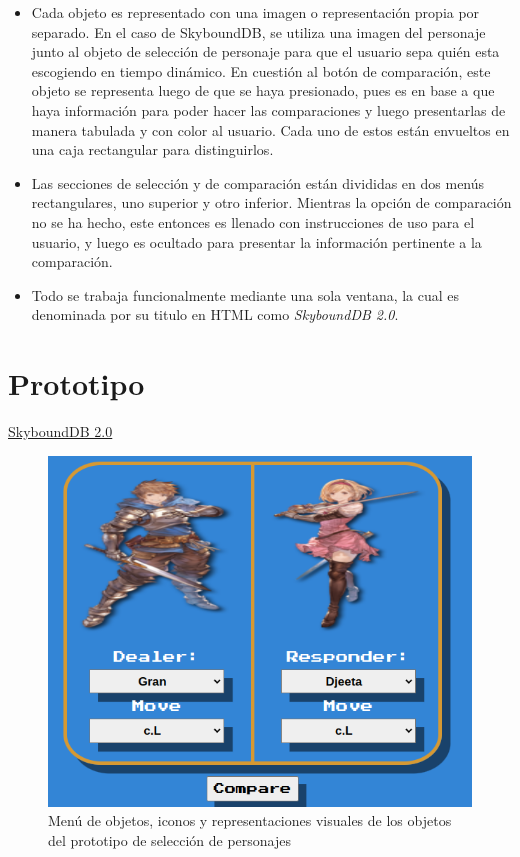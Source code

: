 \begin{itemize}
\begin{itemize}
    \end{itemize}
    \item Cada objeto es representado con una imagen o representación propia por separado. En el caso de SkyboundDB, se utiliza una imagen del personaje junto al objeto de selección de personaje para que el usuario sepa quién esta escogiendo en tiempo dinámico. En cuestión al botón de comparación, este objeto se representa luego de que se haya presionado, pues es en base a que haya información para poder hacer las comparaciones y luego presentarlas de manera tabulada y con color al usuario. Cada uno de estos están envueltos en una caja rectangular para distinguirlos.
    \item Las secciones de selección y de comparación están divididas en dos menús rectangulares, uno superior y otro inferior. Mientras la opción de comparación no se ha hecho, este entonces es llenado con instrucciones de uso para el usuario, y luego es ocultado para presentar la información pertinente a la comparación.
    \item Todo se trabaja funcionalmente mediante una sola ventana, la cual es denominada por su titulo en HTML como \textit{SkyboundDB 2.0}.
\end{itemize}

\section{Prototipo}



\href{https://aramis-matos.github.io/skyboundDB2.0/}{SkyboundDB 2.0}

\begin{center}
    \begin{figure}[ht!]
        \centering
        \includegraphics[height=0.4\textheight]{figures/Character_select_menu-object.png}
        \caption{Menú de objetos, iconos y representaciones visuales de los objetos del prototipo de selección de personajes}
        \label{fig: char sel prt}
    \end{figure}
\end{center}
  
